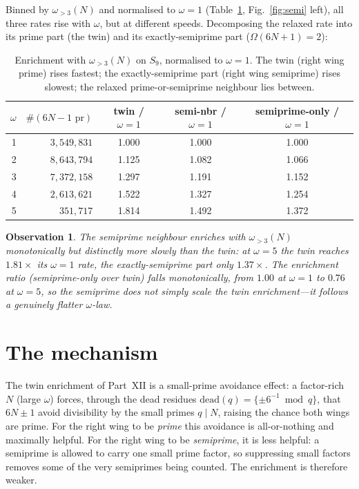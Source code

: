 \documentclass[11pt]{article}
\newtheorem{observation}{Observation}
\begin{document}
Binned by $\omega_{>3}(N)$ and normalised to $\omega=1$ (Table~\ref{tab:enr},
Fig.~\ref{fig:semi} left), all three rates rise with $\omega$, but at different
speeds. Decomposing the relaxed rate into its prime part (the twin) and its
exactly-semiprime part ($\Omega(6N+1)=2$):

\begin{table}[h]\centering\small
\begin{tabular}{rrccc}
\toprule
$\omega$ & $\#(6N{-}1\text{ pr})$ & twin / $\omega{=}1$ & semi-nbr / $\omega{=}1$ & semiprime-only / $\omega{=}1$\\
\midrule
1 & $3{,}549{,}831$ & 1.000 & 1.000 & 1.000\\
2 & $8{,}643{,}794$ & 1.125 & 1.082 & 1.066\\
3 & $7{,}372{,}158$ & 1.297 & 1.191 & 1.152\\
4 & $2{,}613{,}621$ & 1.522 & 1.327 & 1.254\\
5 &   $351{,}717$ & 1.814 & 1.492 & 1.372\\
\bottomrule
\end{tabular}
\caption{Enrichment with $\omega_{>3}(N)$ on $S_9$, normalised to $\omega=1$. The
twin (right wing prime) rises fastest; the exactly-semiprime part (right wing
semiprime) rises slowest; the relaxed prime-or-semiprime neighbour lies between.}
\label{tab:enr}
\end{table}

\begin{observation}
The semiprime neighbour enriches with $\omega_{>3}(N)$ monotonically but
distinctly more slowly than the twin: at $\omega=5$ the twin reaches $1.81\times$
its $\omega=1$ rate, the exactly-semiprime part only $1.37\times$. The
enrichment ratio (semiprime-only over twin) falls monotonically, from $1.00$ at
$\omega=1$ to $0.76$ at $\omega=5$, so the semiprime does not simply scale the twin
enrichment---it follows a genuinely flatter $\omega$-law.
\end{observation}

\section{The mechanism}

The twin enrichment of Part~XII is a small-prime avoidance effect: a factor-rich
$N$ (large $\omega$) forces, through the dead residues
$\mathrm{dead}(q)=\{\pm6^{-1}\bmod q\}$, that $6N\pm1$ avoid divisibility by the
small primes $q\mid N$, raising the chance both wings are prime. For the right wing
to be \emph{prime} this avoidance is all-or-nothing and maximally helpful. For the
right wing to be \emph{semiprime}, it is less helpful: a semiprime is allowed to
carry one small prime factor, so suppressing small factors removes some of the very
semiprimes being counted. The enrichment is therefore weaker.
\end{document}
